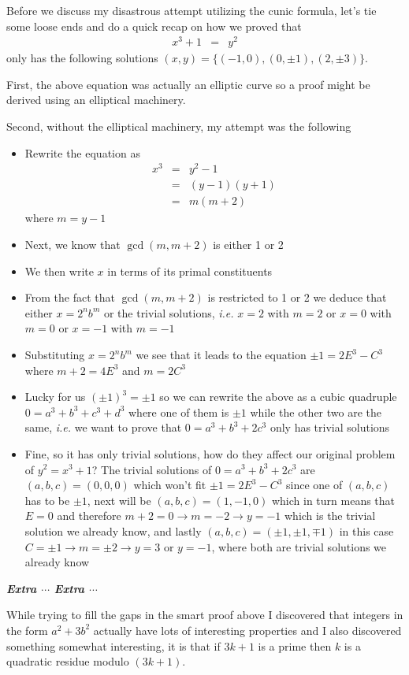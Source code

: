 \documentclass[aps,preprint,preprintnumbers,nofootinbib,showpacs,prd]{revtex4-1}
\newcommand{\ie}{{\it i.e.} }
\newcommand{\bit}{\begin{itemize}}
\newcommand{\eit}{\end{itemize}}
\newcommand{\nbea}{\begin{eqnarray*}}
\newcommand{\neea}{\end{eqnarray*}}
\begin{document}
Before we discuss my disastrous attempt utilizing the cunic formula, let's tie some loose ends and do a quick recap on how we proved that
%
\nbea
x^3 + 1 & = & y^2
\neea
%
only has the following solutions $(x,y) = \{(-1,0), (0,\pm1), (2,\pm3)\}$.

First, the above equation was actually an elliptic curve so a proof might be derived using an elliptical machinery.

Second, without the elliptical machinery, my attempt was the following
\bit
\item Rewrite the equation as 
%
\nbea
x^3 & = & y^2 - 1\\
& = & (y-1)(y+1)\\
& = & m(m+2)
\neea
%
where $m = y-1$
\item Next, we know that $\gcd(m,m+2)$ is either 1 or 2
\item We then write $x$ in terms of its primal constituents
\item From the fact that $\gcd(m,m+2)$ is restricted to 1 or 2 we deduce that either $x = 2^n b^m$ or the trivial solutions, \ie $x = 2$ with $m = 2$ or $x = 0$ with $m = 0$ or $x = -1$ with $m = -1$
\item Substituting $x = 2^n b^m$ we see that it leads to the equation $\pm 1 = 2E^3 - C^3$ where $m + 2 = 4E^3$ and $m = 2C^3$
\item Lucky for us $(\pm1)^3 = \pm 1$ so we can rewrite the above as a cubic quadruple $0 = a^3 + b^3 + c^3 + d^3$ where one of them is $\pm1$ while the other two are the same, \ie we want to prove that $0 = a^3 + b^3 + 2c^3$ only has trivial solutions
\item Fine, so it has only trivial solutions, how do they affect our original problem of $y^2 = x^3 + 1$? The trivial solutions of $0 = a^3 + b^3 + 2c^3$ are $(a,b,c) = (0,0,0)$ which won't fit $\pm 1 = 2E^3 - C^3$ since one of $(a,b,c)$ has to be $\pm 1$, next will be $(a,b,c) = (1,-1,0)$ which in turn means that $E = 0$ and therefore $m+2 = 0 \to m = -2 \to y = -1$ which is the trivial solution we already know, and lastly $(a,b,c) = (\pm1,\pm1,\mp1)$ in this case $C = \pm 1 \to m = \pm 2 \to y = 3$ or $y = -1$, where both are trivial solutions we already know
\eit

\bigskip
\textit{\textbf{Extra $\cdots$ Extra $\cdots$}}
\smallskip

While trying to fill the gaps in the smart proof above I discovered that integers in the form $a^2 + 3b^2$ actually have lots of interesting properties and I also discovered something somewhat interesting, it is that if $3k + 1$ is a prime then $k$ is a quadratic residue modulo $(3k + 1)$.
\end{document}
